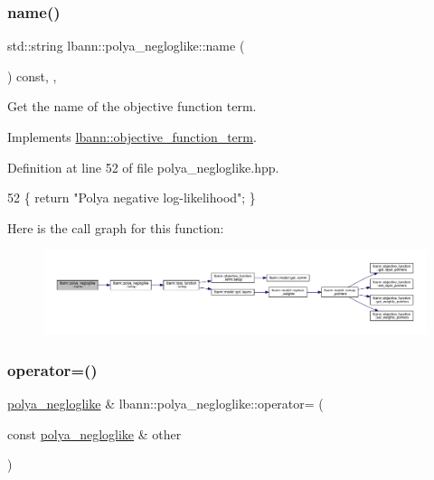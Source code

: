 \subsubsection{\texorpdfstring{name()}{name()}}
{\footnotesize\ttfamily std\+::string lbann\+::polya\+\_\+negloglike\+::name (\begin{DoxyParamCaption}{ }\end{DoxyParamCaption}) const\hspace{0.3cm}{\ttfamily [inline]}, {\ttfamily [override]}, {\ttfamily [virtual]}}

Get the name of the objective function term. 

Implements \hyperlink{classlbann_1_1objective__function__term_a964fbfad3dd0434aa8f32c5fedf1079a}{lbann\+::objective\+\_\+function\+\_\+term}.



Definition at line 52 of file polya\+\_\+negloglike.\+hpp.


\begin{DoxyCode}
52 \{ \textcolor{keywordflow}{return} \textcolor{stringliteral}{"Polya negative log-likelihood"}; \}
\end{DoxyCode}
Here is the call graph for this function\+:\nopagebreak
\begin{figure}[H]
\begin{center}
\leavevmode
\includegraphics[width=350pt]{classlbann_1_1polya__negloglike_ab787129d7caa79b04b91a9660b31d3b8_cgraph}
\end{center}
\end{figure}
\mbox{\label{classlbann_1_1polya__negloglike_a13d1e4b96c6e99bb39afc2b349ad9588}} 
\subsubsection{\texorpdfstring{operator=()}{operator=()}}
{\footnotesize\ttfamily \hyperlink{classlbann_1_1polya__negloglike}{polya\+\_\+negloglike} \& lbann\+::polya\+\_\+negloglike\+::operator= (\begin{DoxyParamCaption}\item[{const \hyperlink{classlbann_1_1polya__negloglike}{polya\+\_\+negloglike} \&}]{other }\end{DoxyParamCaption})}

